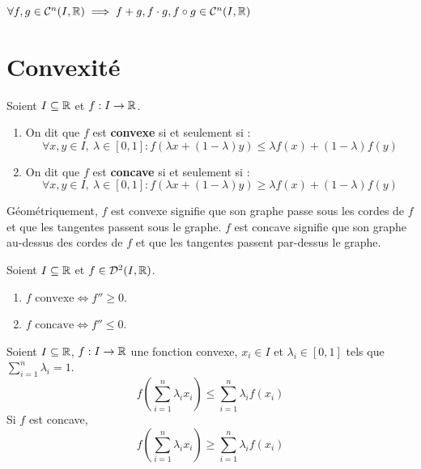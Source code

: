 \begin{proposition}
	$\forall f, g \in \mathcal{C}^n(I, \mathbb{R}) \implies f + g, f \cdot g, f \circ g \in \mathcal{C}^n(I, \mathbb{R})$
\end{proposition}

\section{Convexité}
\begin{definition}
    Soient $I \subseteq \mathbb{R}$ et $f : I \to \mathbb{R}$.
    \begin{enumerate}
        \item On dit que $f$ est \textbf{convexe} si et seulement si : 
        \[ \forall x, y \in I,\ \lambda \in [0, 1] : f(\lambda x + (1 - \lambda)y) \leq \lambda f(x) + (1 - \lambda) f(y) \]
        \item On dit que $f$ est \textbf{concave} si et seulement si : 
        \[ \forall x, y \in I,\ \lambda \in [0, 1] : f(\lambda x + (1 - \lambda)y) \geq \lambda f(x) + (1 - \lambda) f(y) \]
    \end{enumerate}
\end{definition}

\par Géométriquement, $f$ est convexe signifie que son graphe passe sous les cordes de $f$ et que les tangentes passent sous le graphe. $f$ est concave signifie que son graphe au-dessus des cordes de $f$ et que les tangentes passent par-dessus le graphe.

\begin{theorem}
	Soient $I \subseteq \mathbb{R}$ et $f \in \mathcal{D}^2(I, \mathbb{R})$.
        \begin{enumerate}
                \item $f \text{ convexe} \iff f'' \geq 0$.
                \item $f \text{ concave} \iff f'' \leq 0$.
            \end{enumerate}
\end{theorem}

\begin{theorem}
	Soient $I \subseteq \mathbb{R}$, $f : I \to \mathbb{R}$ une fonction convexe, $x_i \in I$ et $\lambda_i \in [0, 1]$ tels que $\sum_{i=1}^n \lambda_i = 1$.
	\[ f \left( \sum_{i=1}^{n} \lambda_i x_i \right) \leq \sum_{i=1}^{n} \lambda_i f(x_i) \]
	Si $f$ est concave, 
	\[ f \left( \sum_{i=1}^{n} \lambda_i x_i \right) \geq \sum_{i=1}^{n} \lambda_i f(x_i) \]
\end{theorem}

